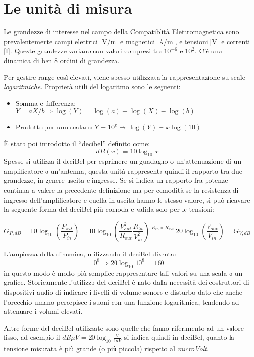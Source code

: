 \section{Le unità di misura}
Le grandezze di interesse nel campo della Compatiblità Elettromagnetica sono prevalentemente
campi elettrici [V/m] e magnetici [A/m], e tensioni [V] e correnti [I].
Queste grandezze variano con valori compresi tra $10^{-6}$ e $10^{2}$. C'è una dinamica di ben 8 ordini di grandezza.

Per gestire range così elevati, viene spesso utilizzata la rappresentazione su scale \textit{logaritmiche}.
Proprietà utili del logaritmo sono le seguenti:
\begin{itemize}
 \item [] Somma e differenza: $Y = aX/b \Rightarrow \log(Y) = \log(a) + \log(X) - \log(b) $
 \item [] Prodotto per uno scalare: $Y = 10^x \Rightarrow \log(Y) = x\log(10) $
\end{itemize}

È stato poi introdotto il ``decibel'' definito come:
$$\si{dB}(x) = 10\log_{10}x $$
Spesso si utilizza il deciBel per esprimere un guadagno o un'attenuazione di un amplificatore o un'antenna,
questa unità rappresenta quindi il rapporto tra due grandezze, in genere uscita e ingresso.
Se si indica un rapporto fra potenze continua a valere la precedente definizione ma per comodità
se la resistenza di ingresso dell'amplificatore e quella in uscita hanno lo stesso valore, si può ricavare
la seguente forma del deciBel più comoda e valida solo per le tensioni:

$$G_{P,\si{dB}} = 10\log_{10}\left(\frac{P_{out}}{P_{in}} \right) = 
10\log_{10}\left( \frac{V_{out}^2}{R_{out}}\frac{R_{in}}{V_{in}^2} \right) \stackrel{R_{in} = R_{out}}{=}
20\log_{10}\left(\frac{V_{out}}{V_{in}}\right) = G_{V,\si{dB}} $$

L'ampiezza della dinamica, utilizzando il deciBel diventa:
$$10^8 \Rightarrow 20\log_{10}10^8 = 160$$
in questo modo è molto più semplice rappresentare tali valori su una scala o un grafico.
Storicamente l'utilizzo del deciBel è nato dalla necessità dei costruttori di dispositivi audio di indicare
i livelli di volume sonoro e disturbo dato che anche l'orecchio umano percepisce i suoni con una funzione
logaritmica, tendendo ad attenuare i volumi elevati.

Altre forme del deciBel utilizzate sono quelle che fanno riferimento ad un valore fisso,
ad esempio il $\si{dB}\mu V = 20\log_{10}\frac{V}{1 \mu V}$ si indica quindi in deciBel, quanto la tensione
misurata è più grande (o più piccola) rispetto al \textit{microVolt}.

